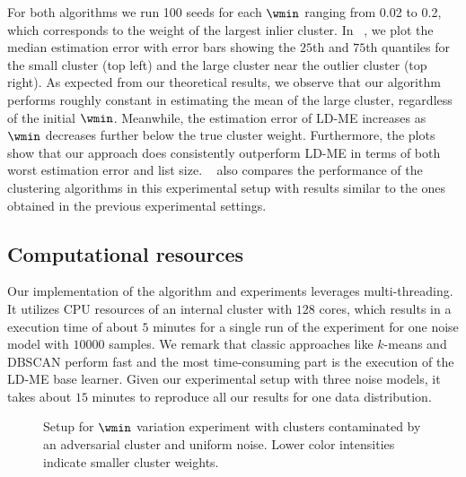 For both algorithms we run 100 seeds for each \(\wmin\) ranging from 0.02 to 0.2, which corresponds to the weight of the largest inlier cluster. In ~, we plot the median estimation error with error bars showing the \(25\)th and \(75\)th quantiles for the small cluster (top left) and the large cluster near the outlier cluster (top right). As expected from our theoretical results, we observe that our algorithm performs roughly constant in estimating the mean of the large cluster, regardless of the initial \(\wmin\). Meanwhile, the estimation error of LD-ME increases as \(\wmin\) decreases further below the true cluster weight. Furthermore, the plots show that our approach does consistently outperform LD-ME in terms of both worst estimation error and list size. ~ also compares the performance of the clustering algorithms in this experimental setup with results similar to the ones obtained in the previous experimental settings. 

\subsection{Computational resources}
Our implementation of the algorithm and experiments leverages multi-threading. It utilizes CPU resources of an internal cluster with \(128\) cores, which results in a execution time of about \(5\) minutes for a single run of the experiment for one noise model with \(10000\) samples. We remark that classic approaches like \(k\)-means and DBSCAN perform fast and the most time-consuming part is the execution of the LD-ME base learner. Given our experimental setup with three noise models, it takes about \(15\) minutes to reproduce all our results for one data distribution.

\begin{figure}[hb]
    \centering
    
    
    \caption{Setup for \(\wmin\) variation experiment with clusters contaminated by an adversarial cluster and uniform noise. Lower color intensities indicate smaller cluster weights.}
    \label{fig:wlow_variation_setup}
\end{figure}

